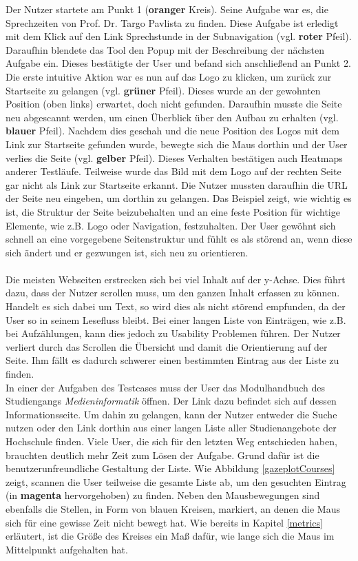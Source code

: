 Der Nutzer startete am Punkt 1 (\textbf{{\color{orange}oranger}} Kreis). Seine Aufgabe war es, die Sprechzeiten von Prof. Dr. Targo Pavlista zu finden. Diese Aufgabe ist erledigt mit dem Klick auf den Link \glqq Sprechstunde\grqq{} in der Subnavigation (vgl. \textbf{{\color{red}roter}} Pfeil). Daraufhin blendete das Tool den Popup mit der Beschreibung der nächsten Aufgabe ein. Dieses bestätigte der User und befand sich anschließend an Punkt 2. Die erste intuitive Aktion war es nun auf das Logo zu klicken, um zurück zur Startseite zu gelangen (vgl. \textbf{{\color{green}grüner}} Pfeil). Dieses wurde an der gewohnten Position (oben links) erwartet, doch nicht gefunden. Daraufhin musste die Seite neu abgescannt werden, um einen Überblick über den Aufbau zu erhalten (vgl. \textbf{{\color{blue}blauer}} Pfeil). Nachdem dies geschah und die neue Position des Logos mit dem Link zur Startseite gefunden wurde, bewegte sich die Maus dorthin und der User verlies die Seite (vgl. \textbf{{\color{yellow}gelber}} Pfeil). Dieses Verhalten bestätigen auch Heatmaps anderer Testläufe. Teilweise wurde das Bild mit dem Logo auf der rechten Seite gar nicht als Link zur Startseite erkannt. Die Nutzer mussten daraufhin die URL der Seite neu eingeben, um dorthin zu gelangen. Das Beispiel zeigt, wie wichtig es ist, die Struktur der Seite beizubehalten und an eine feste Position für wichtige Elemente, wie z.B. Logo oder Navigation, festzuhalten. Der User gewöhnt sich schnell an eine vorgegebene Seitenstruktur und fühlt es als störend an, wenn diese sich ändert und er gezwungen ist, sich neu zu orientieren.\\
\\
Die meisten Webseiten erstrecken sich bei viel Inhalt auf der y-Achse. Dies führt dazu, dass der Nutzer scrollen muss, um den ganzen Inhalt erfassen zu können. Handelt es sich dabei um Text, so wird dies als nicht störend empfunden, da der User so in seinem Lesefluss bleibt. Bei einer langen Liste von Einträgen, wie z.B. bei Aufzählungen, kann dies jedoch zu Usability Problemen führen. Der Nutzer verliert durch das Scrollen die Übersicht und damit die Orientierung auf der Seite. Ihm fällt es dadurch schwerer einen bestimmten Eintrag aus der Liste zu finden.\\
In einer der Aufgaben des Testcases muss der User das Modulhandbuch des Studiengangs \textit{Medieninformatik} öffnen. Der Link dazu befindet sich auf dessen Informationsseite. Um dahin zu gelangen, kann der Nutzer entweder die Suche nutzen oder den Link dorthin aus einer langen Liste aller Studienangebote der Hochschule finden. Viele User, die sich für den letzten Weg entschieden haben, brauchten deutlich mehr Zeit zum Lösen der Aufgabe. Grund dafür ist die benutzerunfreundliche Gestaltung der Liste. Wie Abbildung \ref{gazeplotCourses} zeigt, scannen die User teilweise die gesamte Liste ab, um den gesuchten Eintrag (in \textbf{{\color{magenta}magenta}} hervorgehoben) zu finden. Neben den Mausbewegungen sind ebenfalls die Stellen, in Form von blauen Kreisen, markiert, an denen die Maus sich für eine gewisse Zeit nicht bewegt hat. Wie bereits in Kapitel \ref{metrics} erläutert, ist die Größe des Kreises ein Maß dafür, wie lange sich die Maus im Mittelpunkt aufgehalten hat.

